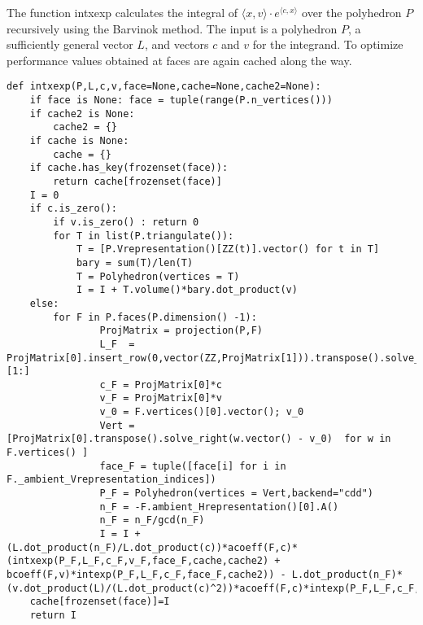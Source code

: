 The function intxexp calculates the integral of \(\langle x,v \rangle \cdot e^{\langle c,x \rangle}\) over the polyhedron \(P\) recursively using the Barvinok method. The input is a polyhedron \(P\),
a sufficiently general vector \(L\), and vectors \(c\) and \(v\) for the integrand. To optimize performance values obtained at faces are again cached along the way.
\begin{lstlisting}
def intxexp(P,L,c,v,face=None,cache=None,cache2=None):
    if face is None: face = tuple(range(P.n_vertices()))
    if cache2 is None:
        cache2 = {}
    if cache is None:
        cache = {}
    if cache.has_key(frozenset(face)):
        return cache[frozenset(face)] 
    I = 0
    if c.is_zero():
        if v.is_zero() : return 0
        for T in list(P.triangulate()):
            T = [P.Vrepresentation()[ZZ(t)].vector() for t in T]
            bary = sum(T)/len(T)
            T = Polyhedron(vertices = T)
            I = I + T.volume()*bary.dot_product(v)
    else:
        for F in P.faces(P.dimension() -1):
                ProjMatrix = projection(P,F)
                L_F  = ProjMatrix[0].insert_row(0,vector(ZZ,ProjMatrix[1])).transpose().solve_right(L)[1:]
                c_F = ProjMatrix[0]*c
                v_F = ProjMatrix[0]*v
                v_0 = F.vertices()[0].vector(); v_0
                Vert = [ProjMatrix[0].transpose().solve_right(w.vector() - v_0)  for w in F.vertices() ]
                face_F = tuple([face[i] for i in F._ambient_Vrepresentation_indices])
                P_F = Polyhedron(vertices = Vert,backend="cdd")
                n_F = -F.ambient_Hrepresentation()[0].A()
                n_F = n_F/gcd(n_F)
                I = I + (L.dot_product(n_F)/L.dot_product(c))*acoeff(F,c)*(intxexp(P_F,L_F,c_F,v_F,face_F,cache,cache2) + bcoeff(F,v)*intexp(P_F,L_F,c_F,face_F,cache2)) - L.dot_product(n_F)*(v.dot_product(L)/(L.dot_product(c)^2))*acoeff(F,c)*intexp(P_F,L_F,c_F,face_F,cache2)
    cache[frozenset(face)]=I
    return I
\end{lstlisting}

